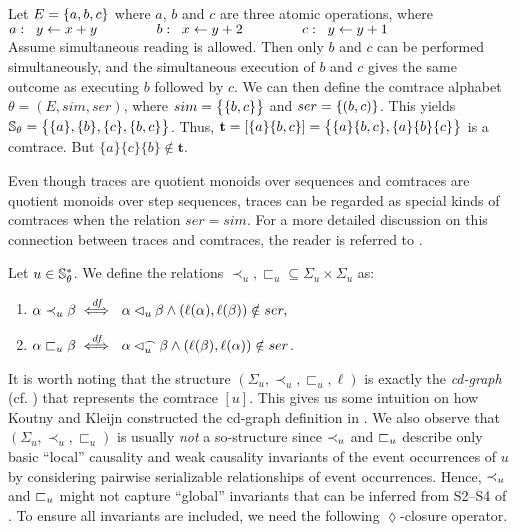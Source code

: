 \documentclass{llncs}
\begin{document}
\begin{example}
Let $E=\{a,b,c\}$ where $a$, $b$ and $c$ are three atomic operations, where\smallskip\\
$a:\;\; y\leftarrow x+y \myspace{1,5} b:\;\; x\leftarrow y+2\myspace{1.5}  c:\;\; y\leftarrow y+1$\smallskip\\
Assume simultaneous reading is allowed. Then only $b$ and $c$ can be performed simultaneously, and the simultaneous execution of $b$ and $c$ gives the same outcome as executing $b$ followed by $c$.
 We can then define the comtrace alphabet $\theta=(E,sim,ser)$, where
$sim = \bigl\{\{b,c\}\bigr\}$ and $ser=\{(b,c)\}$. This yields $\mathbb{S}_{\theta}=\bigl\{\{a\},\{b\},\{c\},\{b,c\}\bigr\}$.
Thus, $\textbf{t}=[\{a\}\{b,c\}] =\bigl\{ \{a\}\{b,c\},\{a\}\{b\}\{c\}\bigr\}$ is a comtrace.
But $\{a\}\{c\}\{b\} \notin \textbf{t}$. \EOD
\label{ex:comtrace1}
\end{example}

Even though traces are quotient monoids over sequences and comtraces are
quotient monoids over step sequences, traces can be regarded as special kinds
of comtraces when the relation $ser=sim$. For a more detailed discussion on this connection between traces and comtraces, the reader is referred to \cite{JL09}.

\begin{definition}[\cite{JK95}]
Let $u\in \mathbb{S}_{\theta}^*$. We define the relations $\prec_u,\sqsubset_u \subseteq \Sigma_{u}\times \Sigma_{u}$
as:
\begin{enumerate}
\item
$\alpha \prec_u \beta \stackrel{\textit{\scriptsize{df}}}{\iff}\  \alpha \lhd_u \beta \wedge (\ell(\alpha),\ell(\beta))\notin ser,$

\item
$ \alpha \sqsubset_u \beta \stackrel{\textit{\scriptsize{df}}}{\iff}\  \alpha \lhd_u^\frown \beta \wedge (\ell(\beta),\ell(\alpha))\notin ser$. \EOD
\end{enumerate}

\label{def:s2inv}
\end{definition}

It is worth noting that the structure $( \Sigma_{u}, \prec_u ,\sqsubset_u, \ell )$ is exactly the \emph{cd-graph} (cf. ) that represents the comtrace $[u]$. This gives us some intuition on how Koutny and Kleijn constructed the cd-graph definition in \cite{KK08}. We  also observe that $( \Sigma_{u}, \prec_u ,\sqsubset_u )$ is usually \emph{not} a so-structure since $\prec_u$ and $\sqsubset_u$ describe only basic ``local'' causality and weak causality invariants of the event occurrences of $u$ by considering pairwise serializable relationships of event occurrences. Hence, $\prec_u$ and $\sqsubset_u$ might not capture ``global'' invariants that can be inferred from \textsf{S2}--\textsf{S4} of . To ensure  all invariants are included, we need the following $\lozenge$-closure operator. 
\end{document}
